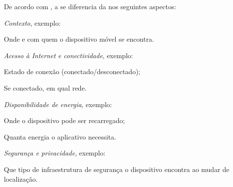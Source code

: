 De acordo com , a \iomt{} se diferencia da \iot{} nos seguintes aspectos:
\begin{alineas}

	\item \emph{Contexto}, exemplo:
		
		\begin{alineas}

			\item Onde e com quem o dispositivo móvel se encontra.

		\end{alineas}

	\item \emph{Acesso à Internet e conectividade}, exemplo:
		
		\begin{alineas}

			\item Estado de conexão (conectado/desconectado);
				
			\item Se conectado, em qual rede.

		\end{alineas}

	\item \emph{Disponibilidade de energia}, exemplo:
		
		\begin{alineas}

			\item Onde o dispositivo pode ser recarregado;
				
			\item Quanta energia o aplicativo necessita.

		\end{alineas}

	\item \emph{Segurança e privacidade}, exemplo:
		
		\begin{alineas}

			\item Que tipo de infraestrutura de segurança o dispositivo encontra ao mudar de localização.

		\end{alineas}

\end{alineas}

\subsection{\mhubcddl{}}

